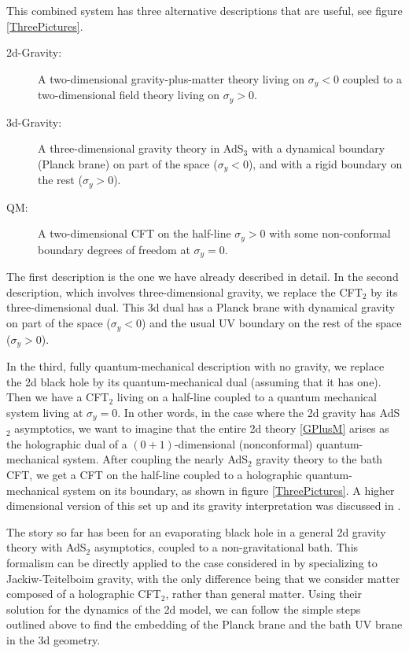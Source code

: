 \documentclass[11pt]{article}
\begin{document}
This combined system has three alternative descriptions that are useful, see figure \ref{ThreePictures}.  
\begin{description}
\item[2d-Gravity:]
A two-dimensional gravity-plus-matter theory living on $\sigma_y<0$ coupled to a two-dimensional field theory living on $\sigma_y>0$.

\item[3d-Gravity:] 
A three-dimensional gravity theory in AdS$_3$ with a dynamical boundary (Planck brane) on part of the space ($\sigma_y<0$), and with a rigid boundary on the rest ($\sigma_y>0$). 

\item[QM:]
A two-dimensional CFT on the half-line $\sigma_y>0$ with some non-conformal boundary degrees of freedom at $\sigma_y = 0$.
\end{description}

The first description is the one we have already described in detail.
In the second description, which involves three-dimensional gravity, we replace the CFT$_2$ by its three-dimensional dual. 
This 3d dual has a Planck brane with dynamical gravity on part of the space ($\sigma_y<0$) and the usual UV boundary on the rest of the space ($\sigma_y>0$). 

In the third, fully quantum-mechanical description with no gravity, we replace the 2d black hole by its quantum-mechanical dual (assuming that it has one). 
Then we have a CFT$_2$ living on a half-line coupled to a quantum mechanical system living at $\sigma_y=0$. 
In other words, in the case where the 2d gravity has AdS$_2$ asymptotics, we want to imagine that the entire 2d theory \eqref{GPlusM} arises as the holographic dual of a $(0+1)$-dimensional (nonconformal) quantum-mechanical system. 
After coupling the nearly AdS$_2$ gravity theory to the bath CFT, we get a CFT on the half-line coupled to a holographic quantum-mechanical system on its boundary, as shown in figure \ref{ThreePictures}. 
A higher dimensional version of this set up and its gravity interpretation was discussed in \cite{Karch:2000ct}.

The story so far has been for an evaporating black hole in a general 2d gravity theory with AdS$_2$ asymptotics, coupled to a non-gravitational bath. 
This formalism can be directly applied to the case considered in \cite{Almheiri:2019psf} by specializing to Jackiw-Teitelboim gravity, with the only difference being that we consider matter composed of a holographic CFT$_2$, rather than general matter.
Using their solution for the dynamics of the 2d model, we can follow the simple steps outlined above to find the embedding of the Planck brane and the bath UV brane in the 3d geometry.  
\end{document}
